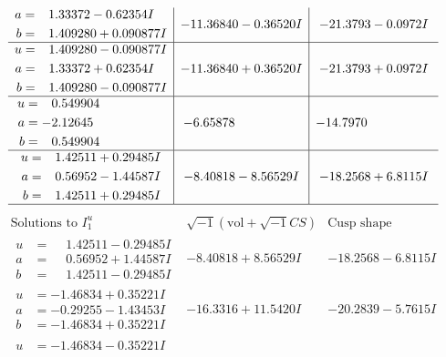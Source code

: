 \documentclass[1p]{elsarticle_modified}
\theoremstyle{definition}
\newcommand{\I}{\sqrt{-1}}
\begin{document}
$$\begin{array}{c|c|c}
\begin{aligned}
a &= \phantom{-}1.33372 - 0.62354 I \\
b &= \phantom{-}1.409280 + 0.090877 I\end{aligned}
 & -11.36840 - 0.36520 I & -21.3793 - 0.0972 I \\ \hline\begin{aligned}
u &= \phantom{-}1.409280 - 0.090877 I \\
a &= \phantom{-}1.33372 + 0.62354 I \\
b &= \phantom{-}1.409280 - 0.090877 I\end{aligned}
 & -11.36840 + 0.36520 I & -21.3793 + 0.0972 I \\ \hline\begin{aligned}
u &= \phantom{-}0.549904\phantom{ +0.000000I} \\
a &= -2.12645\phantom{ +0.000000I} \\
b &= \phantom{-}0.549904\phantom{ +0.000000I}\end{aligned}
 & -6.65878\phantom{ +0.000000I} & -14.7970\phantom{ +0.000000I} \\ \hline\begin{aligned}
u &= \phantom{-}1.42511 + 0.29485 I \\
a &= \phantom{-}0.56952 - 1.44587 I \\
b &= \phantom{-}1.42511 + 0.29485 I\end{aligned}
 & -8.40818 - 8.56529 I & -18.2568 + 6.8115 I\\
 \hline 
 \end{array}$$\newpage$$\begin{array}{c|c|c}  
\text{Solutions to }I^u_{1}& \I (\text{vol} + \sqrt{-1}CS) & \text{Cusp shape}\\
 \hline 
\begin{aligned}
u &= \phantom{-}1.42511 - 0.29485 I \\
a &= \phantom{-}0.56952 + 1.44587 I \\
b &= \phantom{-}1.42511 - 0.29485 I\end{aligned}
 & -8.40818 + 8.56529 I & -18.2568 - 6.8115 I \\ \hline\begin{aligned}
u &= -1.46834 + 0.35221 I \\
a &= -0.29255 - 1.43453 I \\
b &= -1.46834 + 0.35221 I\end{aligned}
 & -16.3316 + 11.5420 I & -20.2839 - 5.7615 I \\ \hline\begin{aligned}
u &= -1.46834 - 0.35221 I \\

\end{aligned}
\end{array}$$
\end{document}
